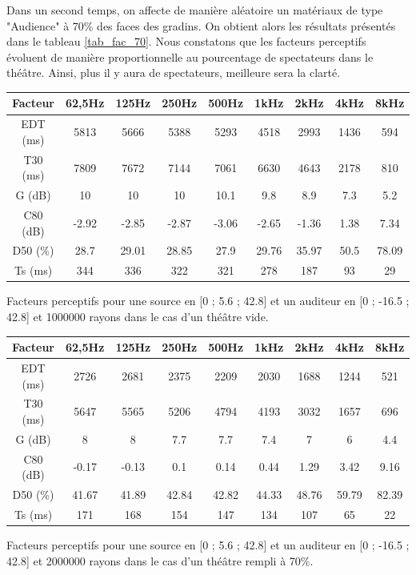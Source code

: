Dans un second temps, on affecte de manière aléatoire un matériaux de type "Audience" à 70\% des faces des gradins. On obtient alors les résultats présentés dans le tableau \ref{tab_fac_70}. Nous constatons que les facteurs perceptifs évoluent de manière proportionnelle au pourcentage de spectateurs dans le théâtre. Ainsi, plus il y aura de spectateurs, meilleure sera la clarté. 

\begin{tableth} 
 \begin{tabular}{| *{9}{c|}} 
 \hline 
 Facteur & 62,5Hz & 125Hz & 250Hz & 500Hz & 1kHz & 2kHz & 4kHz & 8kHz \\ 
 \hline 
 \hline 
\gls{EDT} (ms)& 5813& 5666& 5388& 5293& 4518& 2993& 1436& 594 \\ 
 \hline 
\gls{T30} (ms)& 7809& 7672& 7144& 7061& 6630& 4643& 2178& 810 \\ 
 \hline  
\gls{G} (dB)& 10& 10& 10& 10.1& 9.8& 8.9& 7.3& 5.2 \\ 
 \hline 
\gls{C80} (dB)& -2.92& -2.85& -2.87& -3.06& -2.65& -1.36& 1.38& 7.34 \\ 
 \hline 
\gls{D50} (\%)& 28.7& 29.01& 28.85& 27.9& 29.76& 35.97& 50.5& 78.09 \\ 
 \hline 
\gls{Ts} (ms)& 344& 336& 322& 321& 278& 187& 93& 29 \\ 
 \hline 
\end{tabular} 
 \caption{Facteurs perceptifs pour une source en [0 ; 5.6 ; 42.8] et un auditeur en [0 ; -16.5 ; 42.8] et 1000000 rayons dans le cas d'un théâtre vide.} 
 \label{tab_fac_vide} 
 \end{tableth}
 
 
 \begin{tableth} 
 \begin{tabular}{| *{9}{c|}} 
 \hline 
 Facteur & 62,5Hz & 125Hz & 250Hz & 500Hz & 1kHz & 2kHz & 4kHz & 8kHz \\ 
 \hline 
 \hline 
\gls{EDT} (ms)& 2726& 2681& 2375& 2209& 2030& 1688& 1244& 521 \\ 
 \hline 
\gls{T30} (ms)& 5647& 5565& 5206& 4794& 4193& 3032& 1657& 696 \\ 
 \hline 
\gls{G} (dB)& 8& 8& 7.7& 7.7& 7.4& 7& 6& 4.4 \\ 
 \hline 
\gls{C80} (dB)& -0.17& -0.13& 0.1& 0.14& 0.44& 1.29& 3.42& 9.16 \\ 
 \hline 
\gls{D50} (\%)& 41.67& 41.89& 42.84& 42.82& 44.33& 48.76& 59.79& 82.39 \\ 
 \hline 
\gls{Ts} (ms)& 171& 168& 154& 147& 134& 107& 65& 22 \\ 
 \hline 
\end{tabular} 
 \caption{Facteurs perceptifs pour une source en [0 ; 5.6 ; 42.8] et un auditeur en [0 ; -16.5 ; 42.8] et 2000000 rayons dans le cas d'un théâtre rempli à 70\%.} 
 \label{tab_fac_70} 
 \end{tableth}

